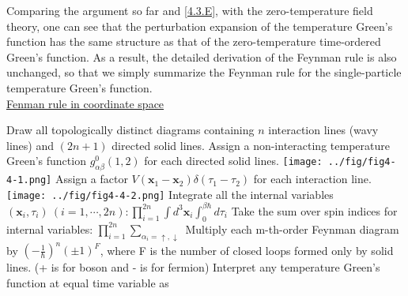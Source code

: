 Comparing the argument so far and \ref{4.3.E}, with the zero-temperature field theory, one can see that the perturbation expansion of the temperature Green's function has the same structure as that of the zero-temperature time-ordered Green's function.
As a result, the detailed derivation of the Feynman rule is also unchanged, so that we simply summarize the Feynman rule for the single-particle temperature Green's function.\\
\uline{Fenman rule in coordinate space}

Draw all topologically distinct diagrams containing $n$ interaction lines (wavy lines) and $(2n+1)$ directed solid lines.
Assign a non-interacting temperature Green's function $g_{\alpha\beta}^0(1,2)$ for each directed solid lines. \texttt{[image: ../fig/fig4-4-1.png]}
Assign a factor $V(\mathbf{x}_1-\mathbf{x}_2)\delta(\tau_1-\tau_2)$ for each interaction line.\\
\texttt{[image: ../fig/fig4-4-2.png]}
Integrate all the internal variables $(\mathbf{x}_i,\tau_i)\ (i=1,\cdots,2n): \prod\limits_{i=1}^{2n} \int d^3 \mathbf{x}_i \int_0^{\beta\hbar} d\tau_i$
Take the sum over spin indices for internal variables: $\prod\limits_{i=1}^{2n} \sum\limits_{\alpha_i=\uparrow,\downarrow}$
Multiply each m-th-order Feynman diagram by $\left(-\frac{1}{\hbar}\right)^n (\pm1)^F$, where F is the number of closed loops formed only by solid lines. (+ is for boson and - is for fermion)
Interpret any temperature Green's function at equal time variable as

